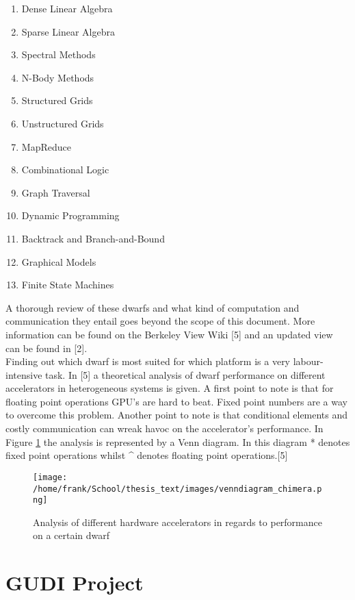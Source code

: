 \begin{multicols}{2}
\begin{enumerate}
\item Dense Linear Algebra
\item Sparse Linear Algebra
\item Spectral Methods
\item N-Body Methods
\item Structured Grids
\item Unstructured Grids
\item MapReduce
\item Combinational Logic
\item Graph Traversal
\item Dynamic Programming
\item Backtrack and Branch-and-Bound
\item Graphical Models
\item Finite State Machines
\end{enumerate}
\end{multicols}

A thorough review of these dwarfs and what kind of computation and communication they entail goes beyond the scope of this document. More information can be found on the Berkeley View Wiki [5] and an updated view can be found in [2].\\
Finding out which dwarf is most suited for which platform is a very labour-intensive task. In [5] a theoretical analysis of dwarf performance on different accelerators in heterogeneous systems is given. A first point to note is that for floating point operations GPU's are hard to beat. Fixed point numbers are a way to overcome this problem. Another point to note is that conditional elements and  costly communication can wreak havoc on the accelerator's performance. In Figure \ref{img:venndiagram_chimera} the analysis is represented by a Venn diagram. In this diagram * denotes fixed point operations whilst \^{} denotes floating point operations.[5]

\begin{figure}[H]
\centering
\texttt{[image: /home/frank/School/thesis\_text/images/venndiagram\_chimera.png]}
\caption{Analysis of different hardware accelerators in regards to performance on a certain dwarf}
\label{img:venndiagram_chimera}
\end{figure}


\section{GUDI Project}

